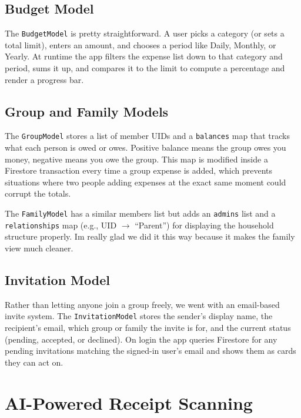 \documentclass[conference]{IEEEtran}
\begin{document}
\subsection{Budget Model}

The \texttt{BudgetModel} is pretty straightforward. A user picks a category (or sets a total limit), enters an amount, and chooses a period like Daily, Monthly, or Yearly. At runtime the app filters the expense list down to that category and period, sums it up, and compares it to the limit to compute a percentage and render a progress bar.

\subsection{Group and Family Models}

The \texttt{GroupModel} stores a list of member UIDs and a \texttt{balances} map that tracks what each person is owed or owes. Positive balance means the group owes you money, negative means you owe the group. This map is modified inside a Firestore transaction every time a group expense is added, which prevents situations where two people adding expenses at the exact same moment could corrupt the totals.

The \texttt{FamilyModel} has a similar members list but adds an \texttt{admins} list and a \texttt{relationships} map (e.g., UID $\to$ ``Parent'') for displaying the household structure properly. Im really glad we did it this way because it makes the family view much cleaner.

\subsection{Invitation Model}

Rather than letting anyone join a group freely, we went with an email-based invite system. The \texttt{InvitationModel} stores the sender's display name, the recipient's email, which group or family the invite is for, and the current status (pending, accepted, or declined). On login the app queries Firestore for any pending invitations matching the signed-in user's email and shows them as cards they can act on.

\section{AI-Powered Receipt Scanning}
\end{document}
